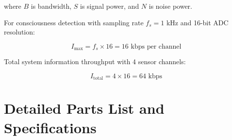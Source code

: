 \documentclass[12pt,a4paper]{article}
\begin{document}
where $B$ is bandwidth, $S$ is signal power, and $N$ is noise power.

For consciousness detection with sampling rate $f_s = 1$ kHz and 16-bit ADC resolution:

\begin{equation}
I_{\text{max}} = f_s \times 16 = 16 \text{ kbps per channel}
\end{equation}

Total system information throughput with 4 sensor channels:

\begin{equation}
I_{\text{total}} = 4 \times 16 = 64 \text{ kbps}
\end{equation}

\section{Detailed Parts List and Specifications}
\end{document}
